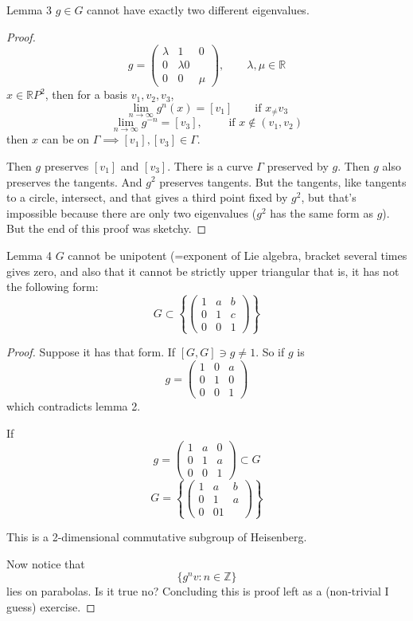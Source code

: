 \begin{thing7}{Lemma 3}\leavevmode
	$g\in G$ cannot have exactly two different eigenvalues.
\end{thing7}

\begin{proof}\leavevmode
\[g=\begin{pmatrix} \lambda &1&0\\0& \lambda 0\\0 &0& \mu \end{pmatrix} ,\qquad \lambda,\mu \in\mathbb{R}\]
$x \in \mathbb{R}P^{2}$, then for a basis $v_1,v_2,v_3$, \[\lim_{n \to \infty} g^n(x)=[v_1]\qquad \text{if $x_\neq v_3$} \]
\[\lim_{n \to \infty} g^{-n}=[v_3],\qquad \text{ if $x  \not\in(v_1,v_2)$} \]
then $x$ can be on $\Gamma \implies [v_1],[v_3]\in\Gamma$.

Then $g$ preserves  $[v_1]$ and $[v_3]$. There is a curve $\Gamma$ preserved by $g$. Then $g$ also preserves the tangents. And $g^2$ preserves tangents. But the tangents, like tangents to a circle, intersect, and that gives a third point fixed by $g^2$, but that's impossible because there are only two eigenvalues ($g^2$ has the same form as $g$). But the end of this proof was sketchy.
\end{proof}

\begin{thing9}{Lemma 4}\leavevmode
	$G$ cannot be unipotent (=exponent of Lie algebra, bracket several times gives zero, and also that it cannot be strictly upper triangular that is, it has not the following form:
	\[G\subset \left\{ \begin{pmatrix} 1 & a & b\\ 0 & 1 & c\\ 0 & 0 & 1 \end{pmatrix}  \right\} \]
\end{thing9}

\begin{proof}\leavevmode
	Suppose it has that form. If $[G,G]\ni g\neq 1$. So if $g$ is
	\[g=\begin{pmatrix} 1 & 0 & a\\ 0 & 1 & 0\\ 0 & 0 & 1 \end{pmatrix} \]
	which contradicts lemma 2.

	If
	\[g=\begin{pmatrix} 1 & a & 0\\ 0 & 1 & a\\ 0 & 0 & 1 \end{pmatrix} \subset G\]
\[G=\left\{ \begin{pmatrix} 1& a & b\\0 & 1 & a\\ 0 & 0 1 \end{pmatrix}  \right\} \]
	\begin{remark}[Misha]\leavevmode
		This is a 2-dimensional commutative subgroup of Heisenberg.
	\end{remark}
Now notice that
\[\{g^nv:n \in \mathbb{Z}\}\]
lies on parabolas. Is it true no? Concluding this is proof left as a (non-trivial I guess) {\color{4}exercise}.
\end{proof}

